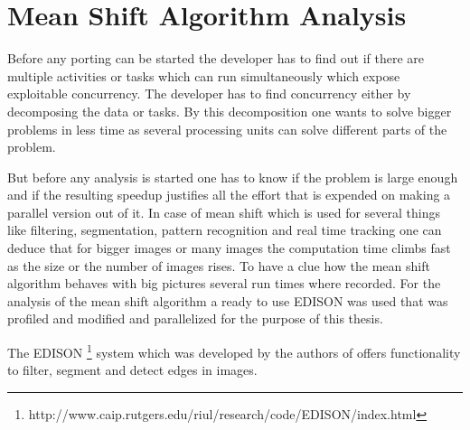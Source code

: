 
\chapter{Mean Shift Algorithm Analysis} %
\label{ch:algorithm_analysis}
Before any porting can be started the developer has to find out if
there are multiple activities or tasks which can run simultaneously
which expose exploitable concurrency. The developer has to find
concurrency either by decomposing the data or tasks. By this
decomposition one wants to solve bigger problems in less time as
several processing units can solve different parts of the problem.

But before any analysis is started one has to know if the problem is
large enough and if the resulting speedup justifies all the effort
that is expended on making a parallel version out of it. In case of
mean shift which is used for several things like filtering,
segmentation, pattern recognition and real time tracking one can
deduce that for bigger images or many images the computation time
climbs fast as the size or the number of images rises. To have a clue
how the mean shift algorithm behaves with big pictures several run
times where recorded.  For the analysis of the mean shift algorithm a
ready to use \gls{EDISON} was used that was profiled and modified and
parallelized for the purpose of this thesis.

The \gls{EDISON}
\footnote{http://www.caip.rutgers.edu/riul/research/code/EDISON/index.html}
system which was developed by the authors
\citeauthor{citeulike:462300} of \citep{citeulike:462300} offers
functionality to filter, segment and detect edges in images.
 
